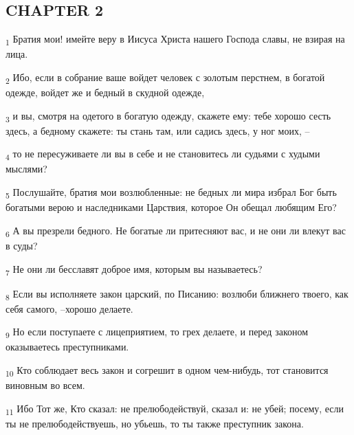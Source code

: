 \subsection{CHAPTER 2}
\begin{tcolorbox}
\textsubscript{1} Братия мои! имейте веру в Иисуса Христа нашего Господа славы, не взирая на лица.
\end{tcolorbox}
\begin{tcolorbox}
\textsubscript{2} Ибо, если в собрание ваше войдет человек с золотым перстнем, в богатой одежде, войдет же и бедный в скудной одежде,
\end{tcolorbox}
\begin{tcolorbox}
\textsubscript{3} и вы, смотря на одетого в богатую одежду, скажете ему: тебе хорошо сесть здесь, а бедному скажете: ты стань там, или садись здесь, у ног моих, --
\end{tcolorbox}
\begin{tcolorbox}
\textsubscript{4} то не пересуживаете ли вы в себе и не становитесь ли судьями с худыми мыслями?
\end{tcolorbox}
\begin{tcolorbox}
\textsubscript{5} Послушайте, братия мои возлюбленные: не бедных ли мира избрал Бог быть богатыми верою и наследниками Царствия, которое Он обещал любящим Его?
\end{tcolorbox}
\begin{tcolorbox}
\textsubscript{6} А вы презрели бедного. Не богатые ли притесняют вас, и не они ли влекут вас в суды?
\end{tcolorbox}
\begin{tcolorbox}
\textsubscript{7} Не они ли бесславят доброе имя, которым вы называетесь?
\end{tcolorbox}
\begin{tcolorbox}
\textsubscript{8} Если вы исполняете закон царский, по Писанию: возлюби ближнего твоего, как себя самого, --хорошо делаете.
\end{tcolorbox}
\begin{tcolorbox}
\textsubscript{9} Но если поступаете с лицеприятием, то грех делаете, и перед законом оказываетесь преступниками.
\end{tcolorbox}
\begin{tcolorbox}
\textsubscript{10} Кто соблюдает весь закон и согрешит в одном чем-нибудь, тот становится виновным во всем.
\end{tcolorbox}
\begin{tcolorbox}
\textsubscript{11} Ибо Тот же, Кто сказал: не прелюбодействуй, сказал и: не убей; посему, если ты не прелюбодействуешь, но убьешь, то ты также преступник закона.
\end{tcolorbox}
